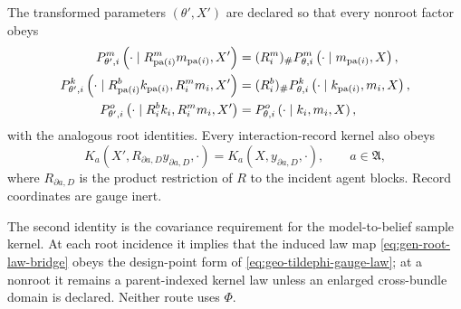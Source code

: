 \medskip
{}
The transformed parameters $(\theta',X')$ are declared so that every nonroot factor obeys
\begin{align}
P_{\theta',i}^{m}
\left(\cdot\mid R_{\operatorname{pa}(i)}^mm_{\operatorname{pa}(i)},X'\right)
&=(R_i^m)_{\#}
P_{\theta,i}^{m}
\left(\cdot\mid m_{\operatorname{pa}(i)},X\right),
\label{eq:gen-gauge-pushforward-model}\\
P_{\theta',i}^{k}
\left(\cdot\mid R_{\operatorname{pa}(i)}^bk_{\operatorname{pa}(i)},R_i^mm_i,X'\right)
&=(R_i^b)_{\#}
P_{\theta,i}^{k}
\left(\cdot\mid k_{\operatorname{pa}(i)},m_i,X\right),
\label{eq:gen-gauge-pushforward-state}\\
P_{\theta',i}^{o}
\left(\cdot\mid R_i^bk_i,R_i^mm_i,X'\right)
&=P_{\theta,i}^{o}
\left(\cdot\mid k_i,m_i,X\right),
\label{eq:gen-gauge-pushforward-obs}
\end{align}
with the analogous root identities. Every interaction-record kernel also obeys
\begin{equation}
K_a\left(X',R_{\partial a,D}y_{\partial a,D},\cdot\right)
=K_a\left(X,y_{\partial a,D},\cdot\right),
\qquad a\in\mathfrak A,
\label{eq:gen-gauge-record-kernel}
\end{equation}
where $R_{\partial a,D}$ is the product restriction of $R$ to the incident agent blocks. Record coordinates are gauge inert. 
\medskip

The second identity is the covariance requirement for the model-to-belief sample
kernel. At each root incidence it implies that the induced law map
\eqref{eq:gen-root-law-bridge} obeys the design-point form of
\eqref{eq:geo-tildephi-gauge-law}; at a nonroot it remains a parent-indexed
kernel law unless an enlarged cross-bundle domain is declared. Neither route
uses $\Phi$.

